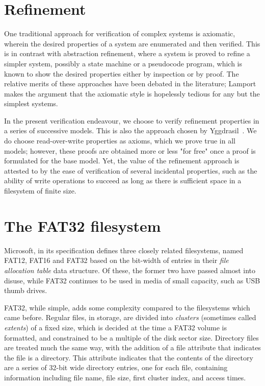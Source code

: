 \documentclass[runningheads,a4paper]{llncs}
\begin{document}
\section{Refinement}

One traditional approach for verification of complex systems is
axiomatic, wherein the desired properties of a system are enumerated
and then verified. This is in contrast with abstraction refinement,
where a system is proved to refine a simpler system, possibly a state
machine or a pseudocode program, which is known to show the desired
properties either by inspection or by proof. The relative merits of
these approaches have been debated in the literature;
Lamport~\cite{lamport1993verification} makes the argument that the
axiomatic style is hopelessly tedious for any but the simplest
systems.

In the present verification endeavour, we choose to verify
refinement properties in a series of successive models. This is also
the approach chosen by Yggdrasil~\cite{sigurbjarnarson2016push}. We do
choose read-over-write properties as axioms, which we prove true in all
models; however, these proofs are obtained more or less "for free"
once a proof is formulated for the base model. Yet, the value of the
refinement approach is attested to by the ease of verification of
several incidental properties, such as the ability of write operations
to succeed as long as there is sufficient space in a filesystem of
finite size.

\section{The FAT32 filesystem}

Microsoft, in its specification \cite{microsoft_2000} defines three
closely related filesystems, named FAT12, FAT16 and FAT32 based on the
bit-width of entries in their \textit{file allocation table} data
structure. Of these, the former two have passed almost into disuse,
while FAT32 continues to be used in media of small capacity, such as
USB thumb drives.

FAT32, while simple, adds some complexity compared to the filesystems
which came before. Regular files, in storage, are divided into
\textit{clusters} (sometimes called \textit{extents}) of a fixed size,
which is decided at the time a FAT32 volume is formatted, and
constrained to be a multiple of the disk sector size. Directory files
are treated much the same way, with the
addition of a file attribute that indicates the file is a
directory. This attribute indicates that the contents of the directory
are a series of 32-bit wide directory entries, one for each file,
containing information including file name, file size, first cluster
index, and access times.
\end{document}
